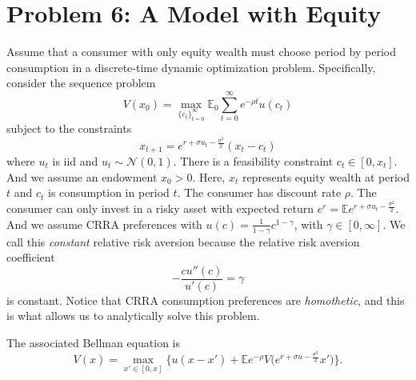\documentclass[11pt]{extarticle}
\theoremstyle{plain}
\theoremstyle{definition}
\begin{document}
\vspace{10mm}
\section*{Problem 6: A Model with Equity}

\vspace{5mm}
\noindent
Assume that a consumer with only equity wealth must choose period by period consumption in a discrete-time dynamic optimization problem. Specifically, consider the sequence problem
\begin{equation*}
	V(x_0) = \max_{ \{ c_t \}_{t=0}^\infty } \mathbb E_0 \sum_{t=0}^\infty e^{- \rho t} u(c_t)
\end{equation*}
subject to the constraints
\begin{equation*}
	x_{t+1} = e^{r + \sigma u_t - \frac{\sigma^2}{2}} (x_t - c_t)
\end{equation*}
where $u_t$ is iid and $u_t \sim \mathcal N(0, 1)$. There is a feasibility constraint $c_t \in [0, x_t]$. And we assume an endowment $x_0 > 0$. Here, $x_t$ represents equity wealth at period $t$ and $c_t$ is consumption in period $t$. The consumer has discount rate $\rho$. The consumer can only invest in a risky asset with expected return $e^r = \mathbb E e^{r + \sigma u_t - \frac{\sigma^2}{2}}$. And we assume CRRA preferences with $u(c) = \frac{1}{1-\gamma} c^{1-\gamma}$, with $\gamma \in [0, \infty]$. We call this \textit{constant} relative risk aversion because the relative risk aversion coefficient
\begin{equation*}
	- \frac{c u''(c)}{u'(c)} = \gamma
\end{equation*}
is constant. Notice that CRRA consumption preferences are \textit{homothetic}, and this is what allows us to analytically solve this problem. 

The associated Bellman equation is 
\begin{equation*}
	V(x) = \max_{x' \in [0, x]} \bigg\{ u(x - x') + \mathbb E e^{- \rho} V \bigg( e^{r + \sigma u - \frac{\sigma^2}{2}} x' \bigg) \bigg\}.
\end{equation*}
\end{document}
